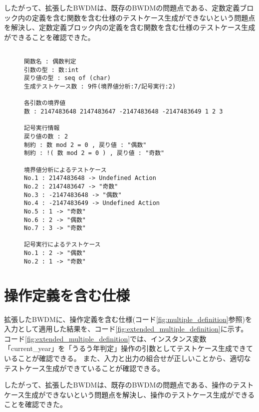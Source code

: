\documentclass[uplatex, report, a4j, 10pt]{jsbook}
\begin{document}
したがって、拡張したBWDMは、既存のBWDMの問題点である、定数定義ブロック内の定義を含む関数を含む仕様のテストケース生成ができないという問題点を解決し、定数定義ブロック内の定義を含む関数を含む仕様のテストケース生成ができることを確認できた。

\lstset{language=}
\begin{figure}[tp]
  \begin{lstlisting}[caption=拡張したBWDMに定数定義ブロック内の定義を含む関数を含む仕様(コード\ref{fig:value_definition})を適用した際の出力,label=fig:extended_value_definition_result]

関数名 : 偶数判定
引数の型 : 数:int 
戻り値の型 : seq of (char)
生成テストケース数 : 9件(境界値分析:7/記号実行:2)

各引数の境界値
数 : 2147483648 2147483647 -2147483648 -2147483649 1 2 3 

記号実行情報
戻り値の数 : 2
制約 : 数 mod 2 = 0 , 戻り値 : "偶数"
制約 : !( 数 mod 2 = 0 ) , 戻り値 : "奇数"

境界値分析によるテストケース
No.1 : 2147483648 -> Undefined Action
No.2 : 2147483647 -> "奇数"
No.3 : -2147483648 -> "偶数"
No.4 : -2147483649 -> Undefined Action
No.5 : 1 -> "奇数"
No.6 : 2 -> "偶数"
No.7 : 3 -> "奇数"

記号実行によるテストケース
No.1 : 2 -> "偶数"
No.2 : 1 -> "奇数"

\end{lstlisting}
\end{figure}

\section{操作定義を含む仕様}\label{sec:tekiyou_operation}
拡張したBWDMに、操作定義を含む仕様(コード\ref{fig:multiple_definition}参照)を入力として適用した結果を、コード\ref{fig:extended_multiple_definition}に示す。
コード\ref{fig:extended_multiple_definition}では、インスタンス変数「current\_year」を「うるう年判定」操作の引数としてテストケース生成できていることが確認できる。
また、入力と出力の組合せが正しいことから、適切なテストケース生成ができていることが確認できる。

したがって、拡張したBWDMは、既存のBWDMの問題点である、操作のテストケース生成ができないという問題点を解決し、操作のテストケース生成ができることを確認できた。
\end{document}
